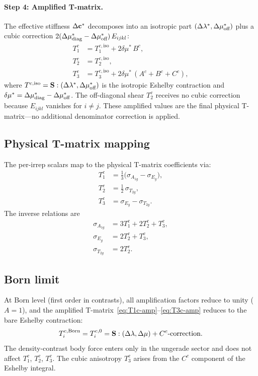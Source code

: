 \paragraph{Step 4: Amplified T-matrix.}
The effective stiffness $\Delta\mathbf{c}^*$ decomposes into an
isotropic part $(\Delta\lambda^*, \Delta\mu^*_{\text{off}})$ plus a cubic
correction $2(\Delta\mu^*_{\text{diag}} - \Delta\mu^*_{\text{off}})\,E_{ijkl}$:
\begin{align}
  T_1^c &= T_1^{c,\text{iso}} + 2\delta\mu^*\, B^c, \label{eq:T1c-amp} \\
  T_2^c &= T_2^{c,\text{iso}}, \label{eq:T2c-amp} \\
  T_3^c &= T_3^{c,\text{iso}} + 2\delta\mu^*\,(A^c + B^c + C^c),
  \label{eq:T3c-amp}
\end{align}
where $T^{c,\text{iso}} = \mathbf{S}:(\Delta\lambda^*, \Delta\mu^*_{\text{off}})$
is the isotropic Eshelby contraction and
$\delta\mu^* = \Delta\mu^*_{\text{diag}} - \Delta\mu^*_{\text{off}}$.
The off-diagonal shear $T_2^c$ receives no cubic correction because
$E_{ijkl}$ vanishes for $i \neq j$.  These amplified values are
the final physical T-matrix---no additional denominator correction
is applied.

\subsection{Physical T-matrix mapping}
\label{sec:physical-mapping}

The per-irrep scalars map to the physical T-matrix coefficients via:
\begin{align}
  T_1^c &= \tfrac{1}{3}\big(\sigma_{A_{1g}} - \sigma_{E_g}\big), \label{eq:T1c-map} \\
  T_2^c &= \tfrac{1}{2}\,\sigma_{T_{2g}}, \label{eq:T2c-map} \\
  T_3^c &= \sigma_{E_g} - \sigma_{T_{2g}}. \label{eq:T3c-map}
\end{align}
The inverse relations are
\begin{align}
  \sigma_{A_{1g}} &= 3T_1^c + 2T_2^c + T_3^c, \\
  \sigma_{E_g}    &= 2T_2^c + T_3^c, \\
  \sigma_{T_{2g}} &= 2T_2^c.
\end{align}

\subsection{Born limit}
\label{sec:born-limit}

At Born level (first order in contrasts), all amplification
factors reduce to unity ($A = 1$), and the amplified
T-matrix~\eqref{eq:T1c-amp}--\eqref{eq:T3c-amp} reduces to
the bare Eshelby contraction:
\begin{equation}
  T_i^{c,\text{Born}} = T_i^{c,0}
  = \mathbf{S}:(\Delta\lambda, \Delta\mu) + C^c\text{-correction}.
  \label{eq:born-T}
\end{equation}
The density-contrast body force enters only in the ungerade sector
and does not affect $T_1^c$, $T_2^c$, $T_3^c$.
The cubic anisotropy $T_3^c$ arises from the $C^c$ component
of the Eshelby integral.

